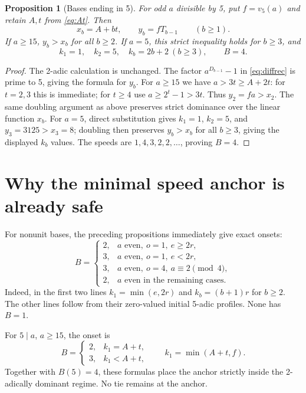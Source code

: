 \documentclass[11pt,letterpaper]{article}
\numberwithin{equation}{section}
\newtheorem{proposition}[theorem]{Proposition}
\theoremstyle{definition}
\begin{document}
\begin{proposition}[Bases ending in 5]\label{prop:fiveprofiles}
For odd $a$ divisible by 5, put $f=v_5(a)$ and retain $A,t$ from
\eqref{eq:At}. Then
\begin{equation}\label{eq:fiveprofiles}
 x_b=A+bt,\qquad y_b=fT_{b-1}\qquad(b\geq1).
\end{equation}
If $a\geq15$, $y_b>x_b$ for all $b\geq2$. If $a=5$, this strict inequality
holds for $b\geq3$, and
\begin{equation}\label{eq:fiveexception}
 k_1=1,\quad k_2=5,\quad k_b=2b+2\ (b\geq3),\qquad B=4.
\end{equation}
\end{proposition}
\begin{proof}
The 2-adic calculation is unchanged. The factor $a^{D_{b-1}}-1$ in
\eqref{eq:diffrec} is prime to 5, giving the formula for $y_b$.
For $a\geq15$ we have $a>3t\geq A+2t$: for $t=2,3$ this is immediate;
for $t\geq4$ use $a\geq2^t-1>3t$. Thus $y_2=fa>x_2$.
The same doubling argument as above preserves strict dominance over the
linear function $x_b$. For $a=5$, direct substitution gives $k_1=1$, $k_2=5$, and
$y_3=3125>x_3=8$; doubling then preserves $y_b>x_b$ for all $b\geq3$,
giving the displayed $k_b$ values. The speeds are $1,4,3,2,2,\ldots$, proving $B=4$.
\end{proof}

\section{Why the minimal speed anchor is already safe}\label{sec:onset}

For nonunit bases, the preceding propositions immediately give exact onsets:
\begin{equation}\label{eq:Beven}
 B=\begin{cases}
2,&a\text{ even},\ o=1,\ e\geq2r,\\
3,&a\text{ even},\ o=1,\ e<2r,\\
3,&a\text{ even},\ o=4,\ a\equiv2\pmod4,\\
2,&a\text{ even in the remaining cases}.
\end{cases}
\end{equation}
Indeed, in the first two lines $k_1=\min(e,2r)$ and $k_b=(b+1)r$ for
$b\geq2$. The other lines follow from their zero-valued initial 5-adic
profiles. None has $B=1$.

For $5\mid a$, $a\geq15$, the onset is
\begin{equation}\label{eq:Bfive}
 B=\begin{cases}2,&k_1=A+t,\\3,&k_1<A+t,\end{cases}
 \qquad k_1=\min(A+t,f).
\end{equation}
Together with $B(5)=4$, these formulas place the anchor strictly inside the
2-adically dominant regime. No tie remains at the anchor.
\end{document}
